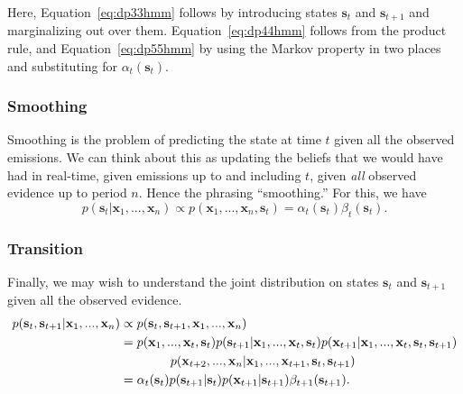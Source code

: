 Here, Equation~\eqref{eq:dp33hmm} follows by introducing states $\textbf{s}_t$  and $\textbf{s}_{t+1}$ and marginalizing out over them. Equation~\eqref{eq:dp44hmm} follows from the product rule, and Equation~\eqref{eq:dp55hmm} by using the Markov property  in two places and substituting for $\alpha_{t}(\textbf{s}_t)$.



\subsubsection{Smoothing}

Smoothing is the problem of predicting the state at time $t$ given all the observed emissions.  We can think about this as updating the beliefs that we would have had in real-time, given emissions up to and including $t$, given {\em all} observed evidence up to period $n$. Hence the phrasing ``smoothing.''
%
For this, we have 
\begin{equation} \label{smoothing-fn}
	p(\textbf{s}_t | \textbf{x}_1, ..., \textbf{x}_n) \propto p(\textbf{x}_1, ..., \textbf{x}_n, \textbf{s}_t) = \alpha_t(\textbf{s}_t) \beta_t(\textbf{s}_t).
\end{equation}



\subsubsection{Transition}

Finally, we may wish to understand the joint distribution
on states $\textbf{s}_t$ and $\textbf{s}_{t+1}$ given all the observed evidence.
%
\begin{align} 
  p(\textbf{s}_{t}, \textbf{s}_{t+1} | \textbf{x}_1, ..., \textbf{x}_n) &
                                                                    \propto      p(\textbf{s}_{t}, \textbf{s}_{t+1} , \textbf{x}_1, ..., \textbf{x}_n)
\notag  \\
                                                                        &= p(\textbf{x}_1, ..., \textbf{x}_t, \textbf{s}_t) p(\textbf{s}_{t+1} | \textbf{x}_1, ..., \textbf{x}_t, \textbf{s}_{t}) p(\textbf{x}_{t+1} |\textbf{x}_1, ..., \textbf{x}_t, \textbf{s}_t, \textbf{s}_{t+1})
  \notag\\
            &\quad\quad     \quad\quad                                                         p(\textbf{x}_{t+2}, ..., \textbf{x}_{n} | \textbf{x}_1, ..., \textbf{x}_{t+1}, \textbf{s}_t, \textbf{s}_{t+1}) \label{eq:88dcp} \\
	&= \alpha_t(\textbf{s}_t) p(\textbf{s}_{t+1} | \textbf{s}_{t}) p(\textbf{x}_{t+1} | \textbf{s}_{t+1}) \beta_{t+1}(\textbf{s}_{t+1}). \label{eq:99dcp}
\end{align}

